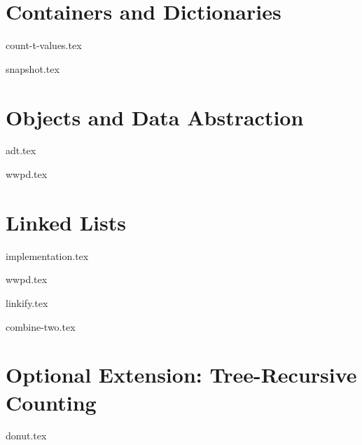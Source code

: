 \documentclass{exam}
\begin{document}
\newpage
\section{Containers and Dictionaries}
\begin{questions}
    \setcounter{question}{5}
    {count-t-values.tex}

    {snapshot.tex}
\end{questions}

\newpage
\section{Objects and Data Abstraction}
\begin{questions}
    \setcounter{question}{7}
    {adt.tex}

    \ifprintanswers\else\vspace{1.95in}\fi
    {wwpd.tex}
\end{questions}

\newpage
\section{Linked Lists}
\begin{blocksection}
{implementation.tex}
\end{blocksection}
\begin{questions}
    \setcounter{question}{9}
    {wwpd.tex}

    {linkify.tex}

    {combine-two.tex}
\end{questions}

\newpage
\section{Optional Extension: Tree-Recursive Counting}
\begin{questions}
    \setcounter{question}{12}
    {donut.tex}
\end{questions}
\end{document}
